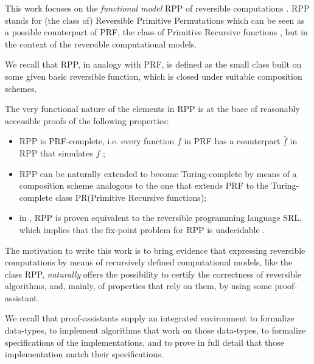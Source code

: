\documentclass[runningheads]{llncs}
\newcommand{\RPP}{\textsf{RPP}\xspace}
\newcommand{\PRF}{\textsf{PRF}\xspace}
\newcommand{\PR}{\textsf{PR}\xspace}
\newcommand{\SRL}{\textsf{SRL}\xspace}
\begin{document}
This work focuses on the \emph{functional model} \RPP of reversible computations \cite{PAOLINI2020218}.
\RPP stands for (the class of) Reversible Primitive Permutations which can be seen as a possible counterpart of \PRF, the class of Primitive Recursive functions \cite{rogers1967theory,soare1987book}, but in the context of the reversible computational models.

We recall that \RPP, in analogy with \PRF, is defined as the small class built on some given basic reversible function, which is closed under suitable composition schemes.

The very functional nature of the elements in \RPP is at the base of reasonably accessible proofs of the following properties:
\begin{itemize}
\item \RPP is \PRF-complete, i.e. every function $ f $ in \PRF has a counterpart $ \hat{f} $ in \RPP that simulates $ f $ \cite{DBLP:journals/tcs/PaoliniPR20};

\item \RPP can be naturally extended to become Turing-complete \cite{Paolini2018NGC} by means of a composition scheme analogous to the one that extends \PRF to the Turing-complete class \PR (Primitive Recursive functions);

\item in \cite{MatosRC2020}, \RPP is proven equivalent  to the reversible programming language \SRL \cite{matos03tcs}, which implies that the fix-point problem for \RPP is undecidable \cite{2318_1734164MatosPaoliniRoversiTCSICTCS18}.
\end{itemize}

The motivation to write this work is to bring evidence that expressing reversible computations by means of recursively defined computational models, like the class \RPP, \emph{naturally} offers the possibility to certify the correctness of reversible algorithms, and, mainly, of properties that rely on them, by using some proof-assistant.

We recall that proof-assistants supply an integrated environment to formalize data-types, to implement algorithms that work on those data-types, to formalize specifications of the implementations, and to prove in full detail that those implementation match their specifications.

\end{document}
